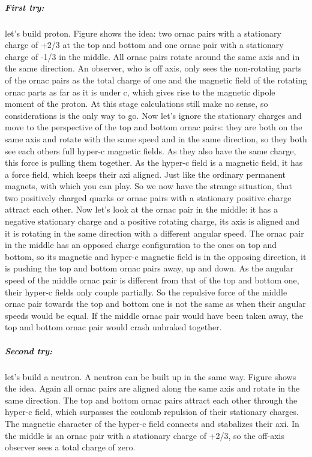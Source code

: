 \subparagraph{First try:} 
let's build proton. Figure shows the idea: two ornac pairs with a stationary charge of +2/3 at the top and bottom and one ornac pair with a stationary charge of -1/3 in the middle. All ornac pairs rotate around the same axis and in the same direction. An observer, who is off axis, only sees the non-rotating parts of the ornac pairs as the total charge of one and the magnetic field of the rotating ornac parts as far as it is under c, which gives rise to the magnetic dipole moment of the proton. At this stage calculations still make no sense, so considerations is the only way to go. Now let's ignore the stationary charges and move to the perspective of the top and bottom ornac pairs: they are both on the same axis and rotate with the same speed and in the same direction, so they both see each others full hyper-c magnetic fields. As they also have the same charge, this force is pulling them together. As the hyper-c field is a magnetic field, it has a force field, which keeps their axi aligned. Just like the ordinary permanent magnets, with which you can play. So we now have the strange situation, that two positively charged quarks or ornac pairs with a stationary positive charge attract each other. Now let's look at the ornac pair in the middle: it has a negative stationary charge and a positive rotating charge, its axis is aligned and it is rotating in the same direction with a different angular speed. The ornac pair in the middle has an opposed charge configuration to the ones on top and bottom, so its magnetic and hyper-c magnetic field is in the opposing direction, it is pushing the top and bottom ornac pairs away, up and down. As the angular speed of the middle ornac pair is different from that of the top and bottom one, their hyper-c fields only couple partially. So the repulsive force of the middle ornac pair towards the top and bottom one is not the same as when their angular speeds would be equal. If the middle ornac pair would have been taken away, the top and bottom ornac pair would crash unbraked together.

\subparagraph{
Second try:}
 let's build a neutron. A neutron can be built up in the same way. Figure shows the idea. Again all ornac pairs are aligned along the same axis and rotate in the same direction. The top and bottom ornac pairs attract each other through the hyper-c field, which surpasses the coulomb repulsion of their stationary charges. The magnetic character of the hyper-c field connects and stabalizes their axi. In the middle is an ornac pair with a stationary charge of +2/3, so the off-axis observer sees a total charge of zero.

